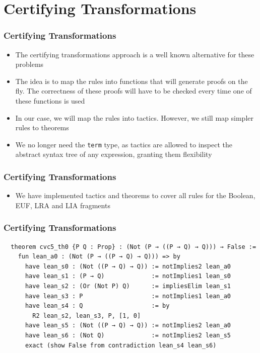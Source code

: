 \documentclass[usepdftitle=false,aspectratio=169,usenames,dvipsnames]{beamer}
\newcommand\vitem{\vfill\item}
\begin{document}
\section{Certifying Transformations}

\begin{frame}
  \frametitle{Certifying Transformations}
  \begin{itemize}
    \item The certifying transformations approach is a well known alternative for these problems
    \vitem The idea is to map the rules into functions that will generate proofs on the fly. The correctness of these proofs will have to be checked every time one of these functions is used
    \vitem In our case, we will map the rules into tactics. However, we still map simpler rules to theorems
    \vitem We no longer need the \texttt{term} type, as tactics are allowed to inspect the abstract syntax tree of any expression, granting them flexibility
  \end{itemize}
\end{frame}

\begin{frame}
  \frametitle{Certifying Transformations}
  \begin{itemize}
    \item We have implemented tactics and theorems to cover all rules for the Boolean, EUF, LRA and LIA fragments
  \end{itemize}
\end{frame}

\begin{frame}[fragile]
  \frametitle{Certifying Transformations}
  \begin{verbatim}
  theorem cvc5_th0 {P Q : Prop} : (Not (P → ((P → Q) → Q))) → False :=
    fun lean_a0 : (Not (P → ((P → Q) → Q))) => by
      have lean_s0 : (Not ((P → Q) → Q)) := notImplies2 lean_a0
      have lean_s1 : (P → Q)             := notImplies1 lean_s0
      have lean_s2 : (Or (Not P) Q)      := impliesElim lean_s1
      have lean_s3 : P                   := notImplies1 lean_a0
      have lean_s4 : Q                   := by
        R2 lean_s2, lean_s3, P, [1, 0]
      have lean_s5 : (Not ((P → Q) → Q)) := notImplies2 lean_a0
      have lean_s6 : (Not Q)             := notImplies2 lean_s5
      exact (show False from contradiction lean_s4 lean_s6)
  \end{verbatim}
\end{frame}
\end{document}
